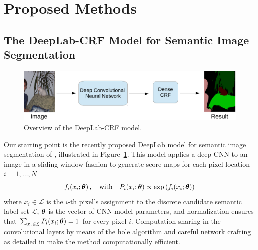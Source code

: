 \section{Proposed Methods}
\label{sec:methods}

\subsection{The DeepLab-CRF Model for Semantic Image Segmentation}

\begin{figure}[tbp!]
  \centering
  \includegraphics[width=0.9\linewidth]{fig/model_test.pdf} 
  \caption{Overview of the DeepLab-CRF model.}
  \label{fig:model_test}
\end{figure}

Our starting point is the recently proposed DeepLab model for semantic
image segmentation of \citet{chen2014semantic}, illustrated in
Figure~\ref{fig:model_test}. This model applies a deep CNN to an image
in a sliding window fashion to generate score maps for each pixel
location $i = 1, \dots, N$
\begin{equation}
  \label{eq:scores}
  f_i(x_i; \boldsymbol{\theta}) \,,
  \quad \mathrm{with} \quad
  P_i(x_i; \boldsymbol{\theta}) \propto \exp \left( f_i(x_i; \boldsymbol{\theta}) \right)
\end{equation}
where $x_i \in \mathcal{L}$ is the $i$-th pixel's assignment to the
discrete candidate semantic label set $\mathcal{L}$, $\boldsymbol{\theta}$ is the
vector of CNN model parameters, and normalization ensures that
$\sum_{x_i \in  \mathcal{L}} P_i(x_i; \boldsymbol{\theta}) = 1$ for every pixel
$i$. Computation sharing in the convolutional layers by means of the
hole algorithm and careful network crafting as detailed in
\citet{chen2014semantic} make the method computationally efficient.

